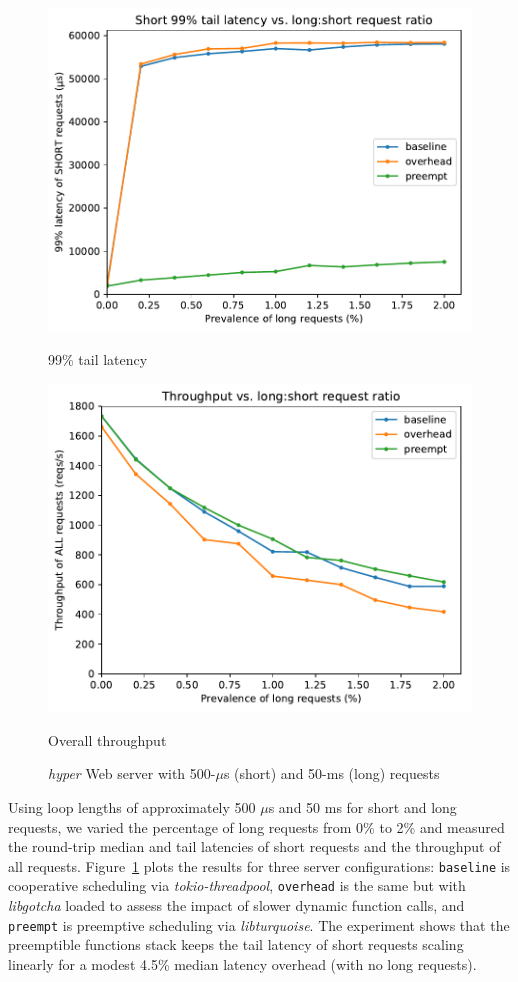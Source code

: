 \begin{figure}
	\begin{minipage}{\columnwidth}
	\includegraphics[width=\textwidth]{figs/twooom_99-short}
	\caption{99\% tail latency}
	\end{minipage}
%
	\begin{minipage}{\columnwidth}
	\includegraphics[width=\textwidth]{figs/twooom_tput}
	\caption{Overall throughput}
	\end{minipage}
\caption{\textit{hyper} Web server with 500-$\mu$s (short) and 50-ms (long) requests}
\label{fig:hyper}
\end{figure}

Using loop lengths of approximately 500 $\mu$s and 50 ms for short and long requests,
we varied the percentage of long requests from 0\% to 2\% and measured the round-trip
median and tail latencies of short requests and the throughput of all requests.
Figure~\ref{fig:hyper} plots the results for three server configurations:\@
\texttt{baseline} is cooperative scheduling via \textit{tokio-threadpool},
\texttt{overhead} is the same but with \textit{libgotcha} loaded to assess the
impact of slower dynamic function calls, and \texttt{preempt} is preemptive
scheduling via \textit{libturquoise}.  The experiment shows that the preemptible
functions stack keeps the tail latency of short requests scaling linearly for a
modest 4.5\% median latency overhead (with no long requests).

